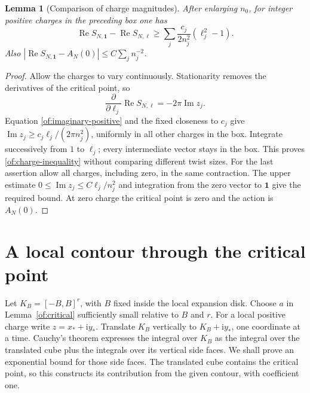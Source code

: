 \documentclass[11pt]{article}
\numberwithin{equation}{section}
\newtheorem{lemma}[theorem]{Lemma}
\theoremstyle{definition}\newtheorem{definition}[theorem]{Definition}
\theoremstyle{remark}\newtheorem{remark}[theorem]{Remark}
\newcommand{\ii}{\mathrm i}
\newcommand{\Rea}{\operatorname{Re}}
\newcommand{\Ima}{\operatorname{Im}}
\begin{document}
\begin{lemma}[Comparison of charge magnitudes]\label{of:charge-gap}
After enlarging $n_0$, for integer positive charges in the preceding
box one has
\begin{equation}\label{of:charge-inequality}
 \Rea S_{N,\mathbf1}-\Rea S_{N,\ell}
       \ge\sum_j\frac{c_j}{2n_j^2}(\ell_j^2-1).
\end{equation}
Also $|\Rea S_{N,\mathbf1}-A_N(0)|\le C\sum_j n_j^{-2}$.
\end{lemma}
\begin{proof}
Allow the charges to vary continuously. Stationarity removes the
derivatives of the critical point, so
\[
 \frac{\partial}{\partial\ell_j}\Rea S_{N,\ell}
                          =-2\pi\Ima z_j.
\]
Equation \eqref{of:imaginary-positive} and the fixed closeness to
$c_j$ give
$\Ima z_j\ge c_j\ell_j/(2\pi n_j^2)$, uniformly in all other
charges in the box. Integrate successively from $1$ to $\ell_j$;
every intermediate vector stays in the box. This proves
\eqref{of:charge-inequality} without comparing different twist sizes.
For the last assertion allow all charges, including zero, in the same
contraction. The upper estimate
$0\le\Ima z_j\le C\ell_j/n_j^2$ and integration from the zero
vector to $\mathbf1$ give the required bound. At zero charge the
critical point is zero and the action is $A_N(0)$.
\end{proof}

\section{A local contour through the critical point}

Let $K_B=[-B,B]^r$, with $B$ fixed inside the local expansion disk.
Choose $a$ in Lemma~\ref{of:critical} sufficiently small relative to
$B$ and $r$. For a local positive charge write $z=x_*+\ii y_*$.
Translate $K_B$ vertically to $K_B+\ii y_*$, one coordinate at a
time. Cauchy's theorem expresses the integral over $K_B$ as the
integral over the translated cube plus the integrals over its vertical
side faces. We shall prove an exponential bound for those side faces.
The translated cube contains the critical point, so this constructs
its contribution from the given contour, with coefficient one.
\end{document}
